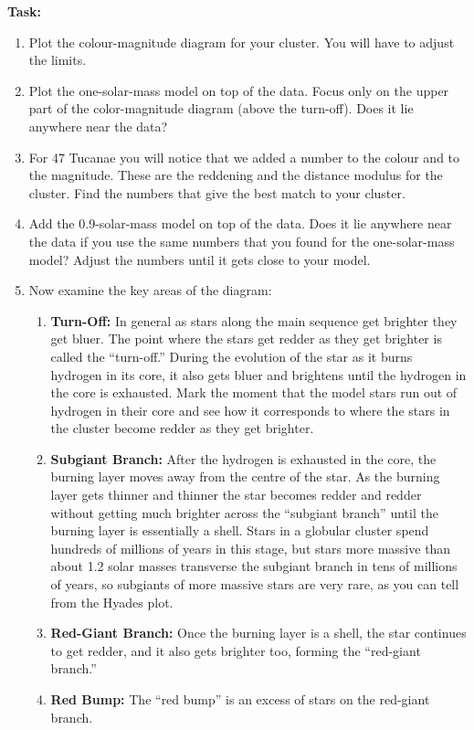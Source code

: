\documentclass{article}
\begin{document}
\textbf{Task:}
\begin{enumerate}
 \setlength\itemsep{0em}
\item Plot the colour-magnitude diagram for your cluster.  You will have to adjust the limits.
\item Plot the one-solar-mass model on top of the data.  Focus only on the upper part of the color-magnitude diagram (above the turn-off). Does it lie anywhere near the data?
\item For 47 Tucanae you will notice that we added a number to the colour and to the magnitude. These are the reddening and the distance modulus for the cluster. Find the numbers that give the best match to your cluster.
\item Add the 0.9-solar-mass model on top of the data.  Does it lie anywhere near the data if you use the same numbers that you found for the one-solar-mass model?  Adjust the numbers until it gets close to your model.
\item Now examine the key areas of the diagram:
\begin{enumerate}
 \setlength\itemsep{0em}
    \item \textbf{Turn-Off:}
    In general as stars along the main sequence get brighter they get bluer.  The point where the stars get redder as they get brighter is called the ``turn-off.''  During the evolution of the star as it burns hydrogen in its core, it also gets bluer and brightens until the hydrogen in the core is exhausted.  Mark the moment that the model stars run out of hydrogen in their core and see how it corresponds to where the stars in the cluster become redder as they get brighter.
    \item \textbf{Subgiant Branch:}
    After the hydrogen is exhausted in the core, the burning layer moves away from the centre of the star.  As the burning layer gets thinner and thinner the star becomes redder and redder without getting much brighter across the ``subgiant branch'' until the burning layer is essentially a shell. Stars in a globular cluster spend hundreds of millions of years in this stage, but stars more massive than about 1.2 solar masses transverse the subgiant branch in tens of millions of years, so subgiants of more massive stars are very rare, as you can tell from the Hyades plot.
    \item \textbf{Red-Giant Branch:}
    Once the burning layer is a shell, the star continues to get redder, and it also gets brighter too, forming the ``red-giant branch.''
    \item \textbf{Red Bump:} The ``red bump'' is an excess of stars on the red-giant branch.  
    

\end{enumerate}
\end{enumerate}
\end{document}
